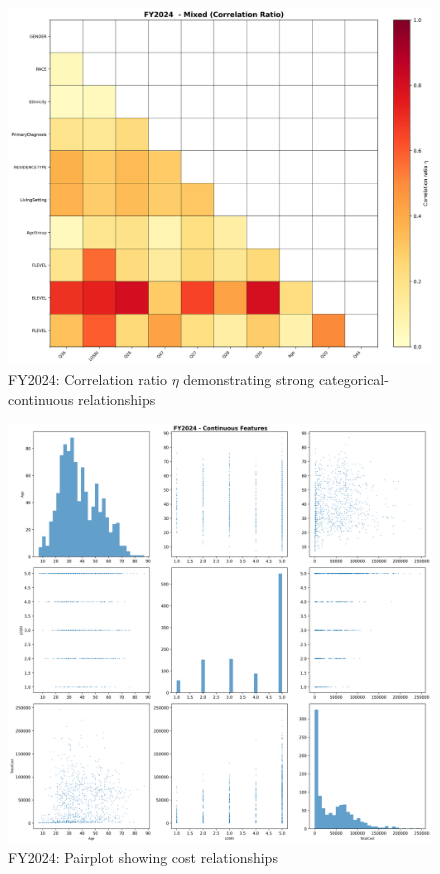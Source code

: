 \newpage

\vspace*{\fill}
\begin{figure}[htbp]
\centering
\includegraphics[width=\textwidth]{fy2024_mixed_correlation_ratio.png}
\caption{FY2024: Correlation ratio $\eta$ demonstrating strong categorical-continuous relationships}
\end{figure}
\vspace*{\fill}

\newpage

\vspace*{\fill}
\begin{figure}[htbp]
\centering
\includegraphics[width=\textwidth]{fy2024_pairplot_top_features.png}
\caption{FY2024: Pairplot showing cost relationships}
\end{figure}
\vspace*{\fill}

